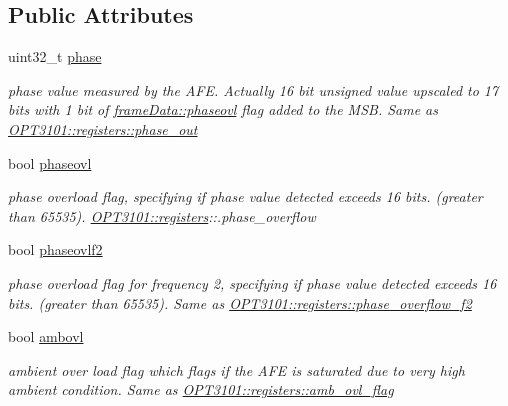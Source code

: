\subsection*{Public Attributes}
\begin{DoxyCompactItemize}
\item 
uint32\+\_\+t \mbox{\hyperlink{class_o_p_t3101_1_1frame_data_af8661d11405953dc378ad4d7cb0f2db6}{phase}}
\begin{DoxyCompactList}\small\item\em phase value measured by the A\+FE. Actually 16 bit unsigned value upscaled to 17 bits with 1 bit of \mbox{\hyperlink{class_o_p_t3101_1_1frame_data_ad1c9f22f2b5a22ce7977334a5ae8ef54}{frame\+Data\+::phaseovl}} flag added to the M\+SB. Same as \mbox{\hyperlink{class_o_p_t3101_1_1registers_a0b410cb503df506724a4b6a1da49ce1e}{O\+P\+T3101\+::registers\+::phase\+\_\+out}} \end{DoxyCompactList}\item 
bool \mbox{\hyperlink{class_o_p_t3101_1_1frame_data_ad1c9f22f2b5a22ce7977334a5ae8ef54}{phaseovl}}
\begin{DoxyCompactList}\small\item\em phase overload flag, specifying if phase value detected exceeds 16 bits. (greater than 65535). \mbox{\hyperlink{class_o_p_t3101_1_1registers}{O\+P\+T3101\+::registers}}\+:\+:.phase\+\_\+overflow \end{DoxyCompactList}\item 
bool \mbox{\hyperlink{class_o_p_t3101_1_1frame_data_afa41c051623d5431aa7c9d27bdb32f6c}{phaseovlf2}}
\begin{DoxyCompactList}\small\item\em phase overload flag for frequency 2, specifying if phase value detected exceeds 16 bits. (greater than 65535). Same as \mbox{\hyperlink{class_o_p_t3101_1_1registers_a63560e719cf9970bc83879a353b2dc9f}{O\+P\+T3101\+::registers\+::phase\+\_\+overflow\+\_\+f2}} \end{DoxyCompactList}\item 
bool \mbox{\hyperlink{class_o_p_t3101_1_1frame_data_ac3c39e0f87987858d5db6291c6b6d4fa}{ambovl}}
\begin{DoxyCompactList}\small\item\em ambient over load flag which flags if the A\+FE is saturated due to very high ambient condition. Same as \mbox{\hyperlink{class_o_p_t3101_1_1registers_a5ba6f5ef459327f64179b6d405dbd101}{O\+P\+T3101\+::registers\+::amb\+\_\+ovl\+\_\+flag}} \end{DoxyCompactList}\item 

\end{DoxyCompactItemize}
